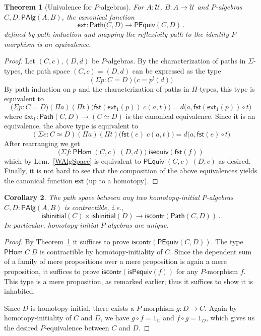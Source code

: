 \documentclass[10pt,a4paper,oneside,reqno]{amsart}
\numberwithin{equation}{section}
\theoremstyle{mythm}
\newtheorem{theorem}{Theorem}[section]
\newtheorem{corollary}[theorem]{Corollary}
\theoremstyle{mydef}
\theoremstyle{myrmk}
\newcommand{\co}{\colon}
\newcommand{\comp}{\circ}
\newcommand{\iscontr}{\mathsf{iscontr}}
\newcommand{\isequiv}{\mathsf{isequiv}}
\newcommand{\ext}{\mathsf{ext}}
\newcommand{\U}{\mathcal{U}}
\newcommand{\fst}{\mathsf{fst}}
\newcommand{\Id}{\mathsf{Path}}
\newcommand{\WAlg}{\mathsf{PAlg}}
\newcommand{\WHom}{\mathsf{PHom}}
\begin{document}
\begin{theorem}[Univalence for $P$-algebras] \label{thm:Punivalence}
For $A:\U$, $B : A \to \U$ and $P$-algebras $C,D  : \WAlg(A,B)$, the canonical function
\[ 
\ext : \Id \big(C,D\big) \to  \mathsf{PEquiv}(C,D) \, .
\]
defined by path induction and mapping the reflexivity path to the identity $P$-morphism is an equivalence.
\end{theorem}
\begin{proof} 
Let $ (C,c), (D,d)$ be $P$-algebras. By the characterization of paths in $\Sigma$-types, the path space $(C,c) = (D,d)$ can be expressed as the type
\[(\Sigma p : C = D) \big( c = p^{!}(d) \big)\]
By path induction on $p$ and the characterization of paths in $\Pi$-types, this type is equivalent to
\[  \big(\Sigma p : C = D\big) (\Pi a) (\Pi t) \Big(\fst(\ext_1(p)) \; c(a,t)\Big) = d\Big(a, \fst(\ext_1(p)) \comp t\Big) \]
where $\ext_1 \co \Id(C,D) \to (C \simeq D)$ is the canonical equivalence. Since it is an equivalence, the above type is equivalent to
\[(\Sigma e : C \simeq D) (\Pi a) (\Pi t) \Big(\fst(e) \; c(a,t)\Big) = d\Big(a, \fst(e) \comp t\Big) \]
After rearranging we get
\[
 \big(\Sigma f \co \WHom \; (C,c) \; (D,d)\big) \; \isequiv(\fst(f))
\]
which by Lem.~\ref{WAlgSpace} is equivalent to $\mathsf{PEquiv}\; (C,c) \; (D,c)$ as desired. Finally, it is not hard to see that the composition of the above equivalences yields the canonical function $\ext$ (up to a homotopy).
\end{proof} 

\begin{corollary}\label{WHInitIso}
The path space between any two homotopy-initial $P$-algebras $C,D : \WAlg(A,B)$ is contractible, i.e., 
\[ 
\mathsf{ishinitial}(C) \times \mathsf{ishinitial}(D) \to \iscontr(\Id(C,D)) \, .
\] 
In particular, homotopy-initial $P$-algebras are unique.
\end{corollary}

\begin{proof}
By Theorem~\ref{thm:Punivalence} it suffices to prove $\iscontr(\mathsf{PEquiv}(C,D))$. The type $\WHom \; C \; D$ is contractible by homotopy-initiality of $C$. Since the dependent sum of a family of mere propositions over a mere proposition is again a mere proposition, it suffices to prove $\iscontr(\mathsf{isPequiv}(f))$ for any $P$-morphism $f$. This type is a mere proposition, as remarked earlier; thus it suffices to show it is inhabited.

Since $D$ is homotopy-initial, there exists a $P$-morphism $g : D \to C$. Again by homotopy-initiality of $C$ and $D$, we have $g \comp f = 1_C$ and $f \comp g = 1_D$, which gives us the desired $P$-equivalence between $C$ and $D$.
\end{proof}
\end{document}
